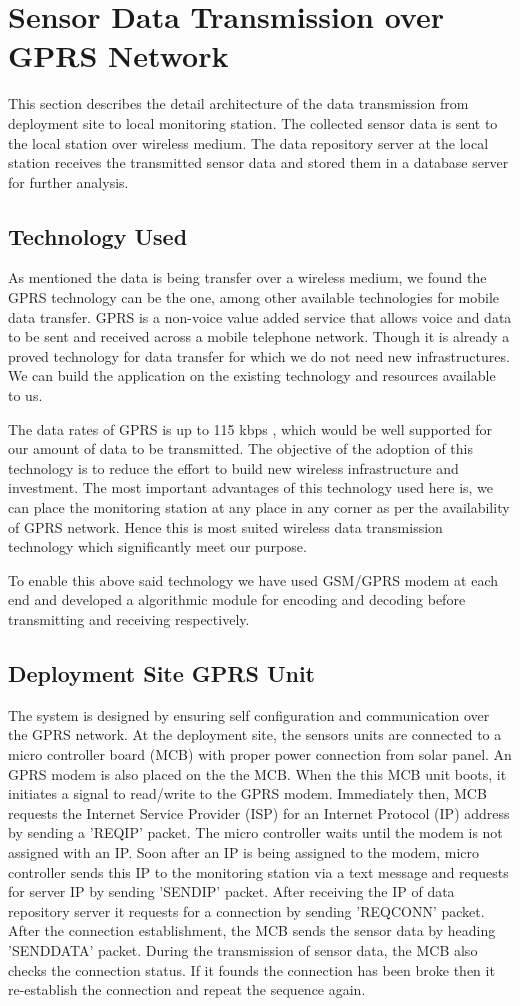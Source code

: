 \documentclass[conference]{IEEEtran}
\begin{document}
\section{Sensor Data Transmission over GPRS Network}
This section describes the detail architecture of the data transmission from deployment site to local monitoring station.
The collected sensor data is sent to the local station over wireless medium. The data repository server at the local station
receives the transmitted sensor data and stored them in a database server for further analysis.
\subsection{Technology Used}
As mentioned the data is being transfer over a wireless medium, we found the GPRS technology can be the one, among other available technologies for mobile data transfer. GPRS is a non-voice value added service that allows voice and data to be sent and received across a mobile telephone network. Though it is already a proved technology for data transfer for which we do not need new infrastructures. We can build the application on the existing technology and resources available to us.
\par
The data rates of GPRS is up to 115 kbps \cite{sahooiitb}, which would be well supported for our amount of data to be transmitted. The objective of the adoption of this technology is to reduce the effort to build new wireless infrastructure and investment. The most important advantages of this technology used here is, we can place the monitoring station at any place in any corner as per the availability of GPRS network. Hence this is most suited wireless data transmission technology which significantly meet our purpose.
\par
To enable this above said technology we have used GSM/GPRS modem at each end and developed a algorithmic module for encoding and decoding before transmitting and receiving respectively.
\subsection{Deployment Site GPRS Unit}
The system is designed by ensuring self configuration and communication over the GPRS network. At the deployment
site, the sensors units are connected to a micro controller board (MCB) with proper power connection from solar panel. An
GPRS modem is also placed on the the MCB. When the this MCB unit boots, it initiates a signal to read/write to the GPRS
modem. Immediately then, MCB requests the Internet Service Provider (ISP) for an Internet Protocol (IP) address by sending a ’REQIP’ packet. The micro controller waits until the modem is not assigned with an IP. Soon after an IP is being assigned to the modem, micro controller sends this IP to the monitoring station via a text message and requests for server IP by sending ’SENDIP’ packet. After receiving the IP of data repository server it requests for a connection by sending ’REQCONN’ packet. After the connection establishment, the MCB sends the sensor data by heading ’SENDDATA’ packet. During the transmission of sensor data, the MCB also checks the connection status. If it founds the connection has been broke then it re-establish the connection and repeat the sequence again.
\end{document}
